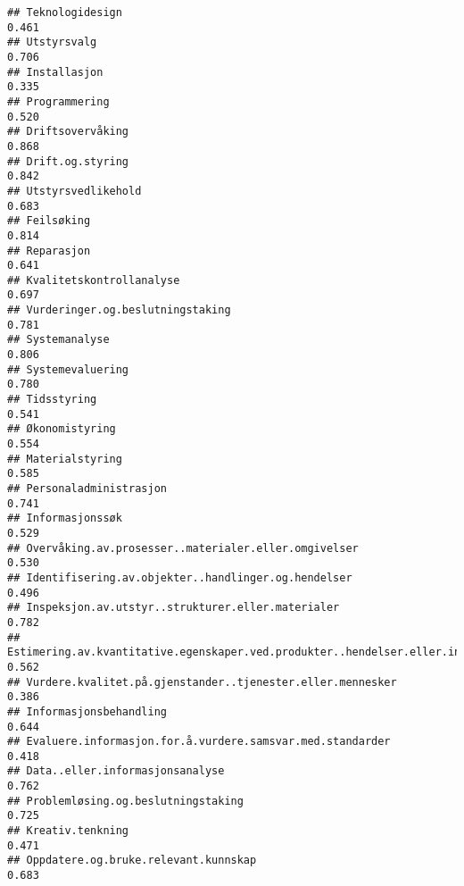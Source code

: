 \documentclass[
]{article}
\begin{document}
\begin{verbatim}
## Teknologidesign                                                                  0.461
## Utstyrsvalg                                                                      0.706
## Installasjon                                                                     0.335
## Programmering                                                                    0.520
## Driftsovervåking                                                                 0.868
## Drift.og.styring                                                                 0.842
## Utstyrsvedlikehold                                                               0.683
## Feilsøking                                                                       0.814
## Reparasjon                                                                       0.641
## Kvalitetskontrollanalyse                                                         0.697
## Vurderinger.og.beslutningstaking                                                 0.781
## Systemanalyse                                                                    0.806
## Systemevaluering                                                                 0.780
## Tidsstyring                                                                      0.541
## Økonomistyring                                                                   0.554
## Materialstyring                                                                  0.585
## Personaladministrasjon                                                           0.741
## Informasjonssøk                                                                  0.529
## Overvåking.av.prosesser..materialer.eller.omgivelser                             0.530
## Identifisering.av.objekter..handlinger.og.hendelser                              0.496
## Inspeksjon.av.utstyr..strukturer.eller.materialer                                0.782
## Estimering.av.kvantitative.egenskaper.ved.produkter..hendelser.eller.informasjon 0.562
## Vurdere.kvalitet.på.gjenstander..tjenester.eller.mennesker                       0.386
## Informasjonsbehandling                                                           0.644
## Evaluere.informasjon.for.å.vurdere.samsvar.med.standarder                        0.418
## Data..eller.informasjonsanalyse                                                  0.762
## Problemløsing.og.beslutningstaking                                               0.725
## Kreativ.tenkning                                                                 0.471
## Oppdatere.og.bruke.relevant.kunnskap                                             0.683

\end{verbatim}
\end{document}
